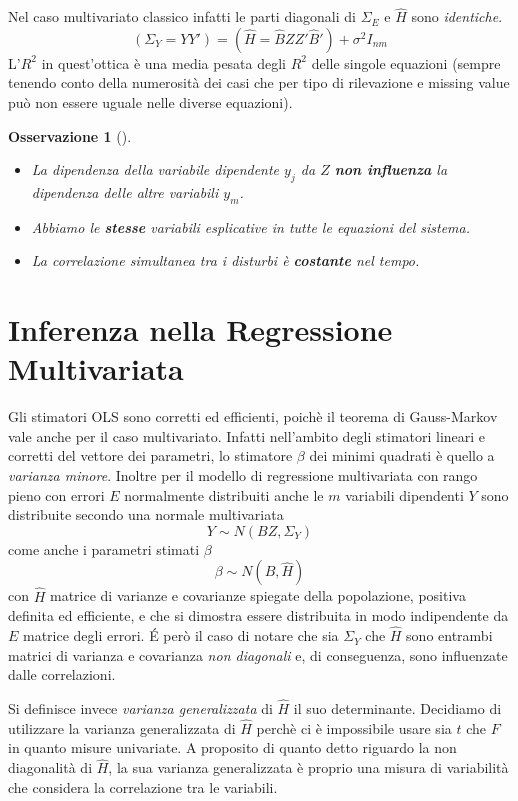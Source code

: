 \documentclass[a4page, 11pt]{article} %
\newtheorem*{remark}{Osservazione}
\begin{document}
Nel caso multivariato classico infatti le parti diagonali di $ \Sigma_E$ e $\hat{H}$ sono \textit{identiche}.
\begin{equation*}
(\Sigma_Y = YY') = (\hat{H}=\hat{B}ZZ'\hat{B}')+\sigma^2 I_{nm}
\end{equation*}
L’$R^{2}$ in quest'ottica è una media pesata degli $R^{2}$ delle singole equazioni (sempre tenendo conto della numerosità dei casi che per tipo di rilevazione e missing value può non essere uguale nelle diverse equazioni).

\begin{remark}[]\ \\
\begin{itemize}
\item La dipendenza della variabile dipendente $y_j$ da $Z$ \textbf{non influenza} la dipendenza delle altre variabili $y_m$.
\item Abbiamo le \textbf{stesse} variabili esplicative in tutte le equazioni del sistema.
\item La correlazione simultanea tra i disturbi è \textbf{costante} nel tempo.
\end{itemize}
\end{remark}
\section{Inferenza nella Regressione Multivariata}
Gli stimatori OLS sono corretti ed efficienti, poichè il teorema di Gauss-Markov vale anche per il caso multivariato. Infatti nell'ambito degli stimatori lineari e corretti del vettore dei parametri, lo stimatore $\beta$ dei minimi quadrati è quello a \textit{varianza minore}. Inoltre per il modello di regressione multivariata con rango pieno con errori $E$ normalmente distribuiti anche le $m$ variabili dipendenti $Y$ sono distribuite secondo una normale multivariata $$Y \sim N(BZ, \Sigma_Y)$$ come anche i parametri stimati $\beta$ $$\beta \sim N(B,\hat{H})$$ con $\hat{H}$ matrice di varianze e covarianze spiegate della popolazione, positiva definita ed efficiente, e che si dimostra essere distribuita in modo indipendente da $E$ matrice degli errori.
\'{E} però il caso di notare che sia $\Sigma_Y$ che $\hat{H}$ sono entrambi matrici di varianza e covarianza \textit{non diagonali} e, di conseguenza, sono influenzate dalle correlazioni.

Si definisce invece \textit{varianza generalizzata} di $\hat{H}$ il suo determinante. Decidiamo di utilizzare la varianza generalizzata di $\hat{H}$ perchè ci è impossibile usare sia $t$ che $F$ in quanto misure univariate. A proposito di quanto detto riguardo la non diagonalità di $\hat{H}$, la sua varianza generalizzata è proprio una misura di variabilità che considera la correlazione tra le variabili. 
\end{document}

